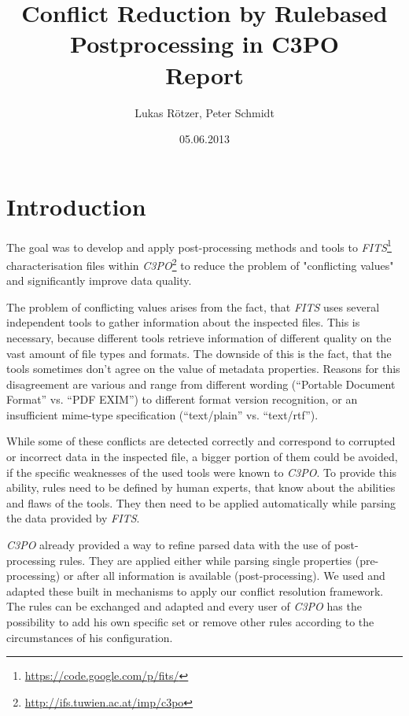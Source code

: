\documentclass[a4paper,12pt]{article}
\title{Conflict Reduction by Rulebased Postprocessing in C3PO\\ \medskip Report}
\author{Lukas Rötzer, Peter Schmidt}
\date{05.06.2013}
\begin{document}
\maketitle
\thispagestyle{empty}

\clearpage



\section{Introduction}

The goal was to develop and apply post-processing methods and tools to \emph{FITS}\footnote{\url{https://code.google.com/p/fits/}} characterisation files within \emph{C3PO}\footnote{\url{http://ifs.tuwien.ac.at/imp/c3po}} to reduce the problem of "conflicting values" and significantly improve data quality. 

The problem of conflicting values arises from the fact, that \emph{FITS} uses several independent tools to gather information about the inspected files. This is necessary, because different tools retrieve information of different quality on the vast amount of file types and formats. The downside of this is the fact, that the tools sometimes don't agree on the value of metadata properties. Reasons for this disagreement are various and range from different wording (``Portable Document Format'' vs. ``PDF EXIM'') to different format version recognition, or an insufficient mime-type specification (``text/plain'' vs. ``text/rtf''). 

While some of these conflicts are detected correctly and correspond to corrupted or incorrect data in the inspected file, a bigger portion of them could be avoided, if the specific weaknesses of the used tools were known to \emph{C3PO}. To provide this ability, rules need to be defined by human experts, that know about the abilities and flaws of the tools. They then need to be applied automatically while parsing the data provided by \emph{FITS}. 

\emph{C3PO} already provided a way to refine parsed data with the use of post-processing rules. They are applied either while parsing single properties (pre-processing) or after all information is available (post-processing). We used and adapted these built in mechanisms to apply our conflict resolution framework. The rules can be exchanged and adapted and every user of \emph{C3PO} has the possibility to add his own specific set or remove other rules according to the circumstances of his configuration.
\end{document}
